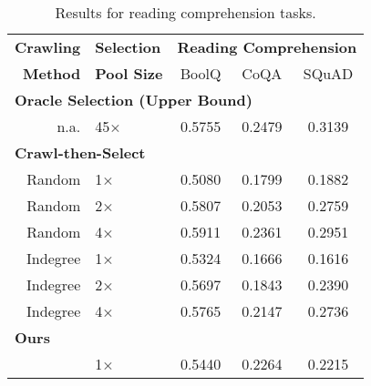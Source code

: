 \begin{table*}
    \centering
    \begin{tabular}{rlccc}
        \toprule
        \textbf{Crawling} & \textbf{Selection} & \multicolumn{3}{c}{\textbf{Reading Comprehension}} \\
        \textbf{Method} & \textbf{Pool Size} & BoolQ & CoQA  & SQuAD \\
        \midrule
        \multicolumn{5}{l}{\textbf{Oracle Selection (Upper Bound)}}\\
        n.a. & 45× & 0.5755 & 0.2479 & 0.3139 \\
        \multicolumn{5}{l}{\textbf{Crawl-then-Select}}\\ 
        Random & 1× & 0.5080 & 0.1799 & 0.1882 \\
        Random & 2× & 0.5807 & 0.2053 & 0.2759 \\
        Random & 4× & 0.5911 & 0.2361 & 0.2951 \\
        Indegree & 1× & 0.5324 & 0.1666 & 0.1616 \\
        Indegree & 2× & 0.5697 & 0.1843 & 0.2390 \\
        Indegree & 4× & 0.5765 & 0.2147 & 0.2736 \\
        \multicolumn{5}{l}{\textbf{Ours}} \\
        \ours{} & 1× & 0.5440 & 0.2264 & 0.2215 \\
        \bottomrule
    \end{tabular}
    \caption{Results for reading comprehension tasks.}
    \label{tab:reading_results}
\end{table*}

